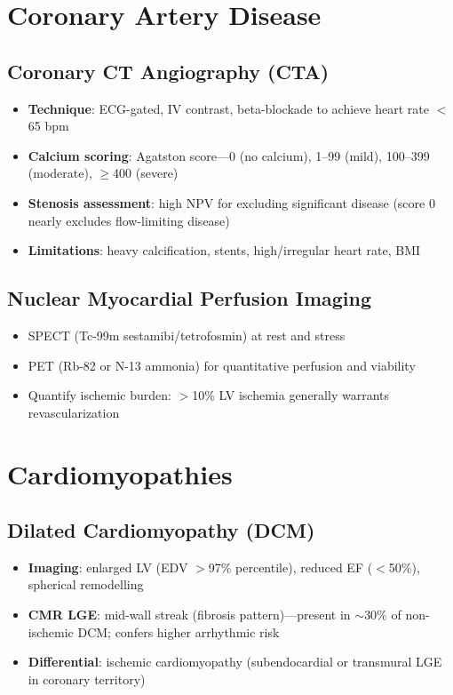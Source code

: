 \section{Coronary Artery Disease}

\subsection{Coronary CT Angiography (CTA)}
\begin{itemize}
  \item \textbf{Technique}: ECG-gated, IV contrast, beta-blockade to achieve heart rate $<$65 bpm
  \item \textbf{Calcium scoring}: Agatston score---0 (no calcium), 1--99 (mild), 100--399 (moderate), $\geq$400 (severe)
  \item \textbf{Stenosis assessment}: high NPV for excluding significant disease (score 0 nearly excludes flow-limiting disease)
  \item \textbf{Limitations}: heavy calcification, stents, high/irregular heart rate, BMI
\end{itemize}

\subsection{Nuclear Myocardial Perfusion Imaging}
\begin{itemize}
  \item SPECT (Tc-99m sestamibi/tetrofosmin) at rest and stress
  \item PET (Rb-82 or N-13 ammonia) for quantitative perfusion and viability
  \item Quantify ischemic burden: $>$10\% LV ischemia generally warrants revascularization
\end{itemize}

\section{Cardiomyopathies}

\subsection{Dilated Cardiomyopathy (DCM)}
\begin{itemize}
  \item \textbf{Imaging}: enlarged LV (EDV $>$97\% percentile), reduced EF ($<$50\%), spherical remodelling
  \item \textbf{CMR LGE}: mid-wall streak (fibrosis pattern)---present in $\sim$30\% of non-ischemic DCM; confers higher arrhythmic risk
  \item \textbf{Differential}: ischemic cardiomyopathy (subendocardial or transmural LGE in coronary territory)
\end{itemize}

